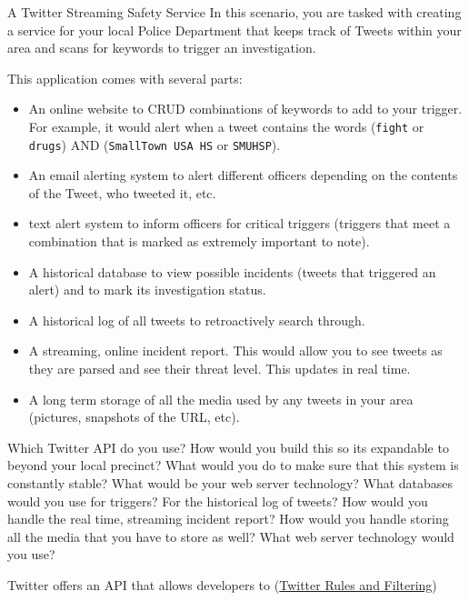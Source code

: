 \documentclass{homework}
\begin{document}
\newpage
\begin{problem}[3]{A Twitter Streaming Safety Service}
    In this scenario, you are tasked with creating a service for your local Police Department that keeps track of Tweets within your area and scans for keywords to trigger an investigation.
    
    \vskip 1mm
   
    This application comes with several parts:
    \begin{itemize}
        \item An online website to CRUD combinations of keywords to add to your trigger. For example, it would alert when a tweet contains the words (\texttt{fight} or \texttt{drugs}) AND (\texttt{SmallTown USA HS} or \texttt{SMUHSP}).
        \item An email alerting system to alert different officers depending on the contents of the Tweet, who tweeted it, etc.
        \item text alert system to inform officers for critical triggers (triggers that meet a combination that is marked as extremely important to note).
        \item A historical database to view possible incidents (tweets that triggered an alert) and to mark its investigation status.
        \item A historical log of all tweets to retroactively search through.
        \item A streaming, online incident report. This would allow you to see tweets as they are parsed and see their threat level. This updates in real time.
        \item A long term storage of all the media used by any tweets in your area (pictures, snapshots of the URL, etc).
    \end{itemize}
    Which Twitter API do you use? How would you build this so its expandable to beyond your local precinct? What would you do to make sure that this system is constantly stable? What would be your web server technology? What databases would you use for triggers? For the historical log of tweets? How would you handle the real time, streaming incident report? How would you handle storing all the media that you have to store as well? What web server technology would you use?
\end{problem}

\begin{solution}
    Twitter offers an API that allows developers to 
    (\href{https://developer.twitter.com/en/docs/tweets/rules-and-filtering/overview/premium-operators}{Twitter Rules and Filtering})


\end{solution}
\end{document}
